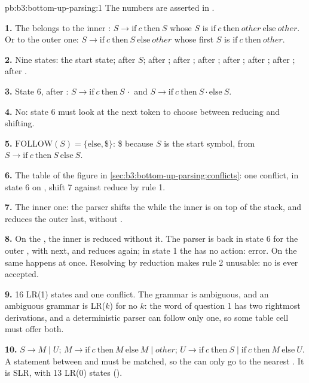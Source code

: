 \begin{solution}{pb:b3:bottom-up-parsing:1}
The numbers are asserted in .

\textbf{1.} The  belongs to the inner : $S \to \mathrm{if}\ c\ \mathrm{then}\ S$ whose $S$ is $\mathrm{if}\ c\ \mathrm{then}\ \mathit{other}\ \mathrm{else}\ \mathit{other}$. Or to the outer one: $S \to \mathrm{if}\ c\ \mathrm{then}\ S\ \mathrm{else}\ \mathit{other}$ whose first $S$ is $\mathrm{if}\ c\ \mathrm{then}\ \mathit{other}$.

\textbf{2.} Nine states: the start state; after $S$; after ; after ; after ; after ; after ; after ; after .

\textbf{3.} State 6, after : $S \to \mathrm{if}\ c\ \mathrm{then}\ S\,\cdot$ and $S \to \mathrm{if}\ c\ \mathrm{then}\ S \cdot \mathrm{else}\ S$.

\textbf{4.} No: state 6 must look at the next token to choose between reducing and shifting.

\textbf{5.} $\mathrm{FOLLOW}(S) = \{\mathrm{else}, \$\}$: \$ because $S$ is the start symbol,  from $S \to \mathrm{if}\ c\ \mathrm{then}\ S\ \mathrm{else}\ S$.

\textbf{6.} The table of the figure in \cref{sec:b3:bottom-up-parsing:conflicts}: one conflict, in state 6 on , shift 7 against reduce by rule 1.

\textbf{7.} The inner one: the parser shifts the  while the inner  is on top of the stack, and reduces the outer  last, without .

\textbf{8.} On the , the inner  is reduced without it. The parser is back in state 6 for the outer , with  next, and reduces again; in state 1 the  has no action: error. On  the same happens at once. Resolving by reduction makes rule 2 unusable: no  is ever accepted.

\textbf{9.} 16 LR(1) states and one conflict. The grammar is ambiguous, and an ambiguous grammar is LR($k$) for no $k$: the word of question 1 has two rightmost derivations, and a deterministic parser can follow only one, so some table cell must offer both.

\textbf{10.} $S \to M \mid U$; $M \to \mathrm{if}\ c\ \mathrm{then}\ M\ \mathrm{else}\ M \mid \mathit{other}$; $U \to \mathrm{if}\ c\ \mathrm{then}\ S \mid \mathrm{if}\ c\ \mathrm{then}\ M\ \mathrm{else}\ U$. A statement between  and  must be matched, so the  can only go to the nearest . It is SLR, with 13 LR(0) states ().


\end{solution}
